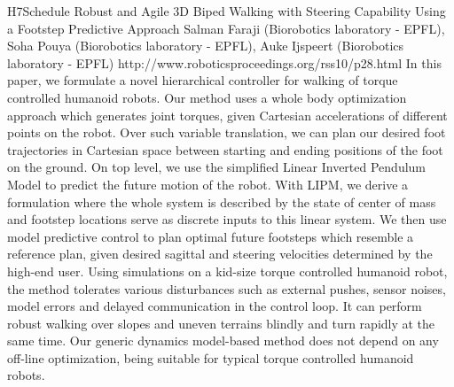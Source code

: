 \begin{spacing}{1.0}
\clearpage
\descriptionPaper
{H7}{Schedule}
{	
Robust and Agile 3D Biped Walking with Steering Capability Using a Footstep Predictive Approach 
}
{
Salman Faraji (Biorobotics laboratory - EPFL), Soha Pouya (Biorobotics laboratory - EPFL), Auke Ijspeert (Biorobotics laboratory - EPFL)
}
{
http://www.roboticsproceedings.org/rss10/p28.html
}
{
In this paper, we formulate a novel hierarchical controller for walking of torque controlled humanoid robots. Our method uses a whole body optimization approach which generates joint torques, given Cartesian accelerations of different points on the robot. Over such variable translation, we can plan our desired foot trajectories in Cartesian space between starting and ending positions of the foot on the ground. On top level, we use the simplified Linear Inverted Pendulum Model to predict the future motion of the robot. With LIPM, we derive a formulation where the whole system is described by the state of center of mass and footstep locations serve as discrete inputs to this linear system. We then use model predictive control to plan optimal future footsteps which resemble a reference plan, given desired sagittal and steering velocities determined by the high-end user. Using simulations on a kid-size torque controlled humanoid robot, the method tolerates various disturbances such as external pushes, sensor noises, model errors and delayed communication in the control loop. It can perform robust walking over slopes and uneven terrains blindly and turn rapidly at the same time. Our generic dynamics model-based method does not depend on any off-line optimization, being suitable for typical torque controlled humanoid robots.
}




\end{spacing}
